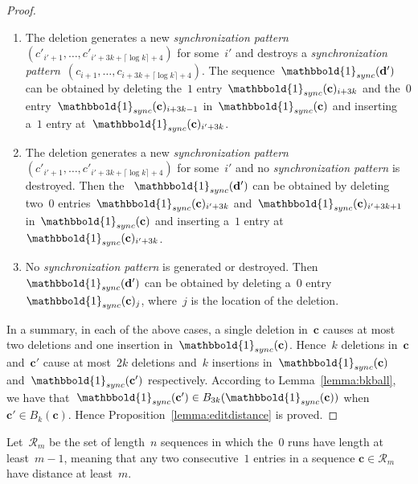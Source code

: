 \documentclass[10pt,a4paper,onecolumn]{IEEEtran}
\newcommand{\1}{\mathbbold{1}}
\newcommand{\boldc}{\mathbf{c}}
\newcommand{\boldd}{\mathbf{d}}
\begin{document}
\begin{proof}
\begin{enumerate}
\item The deletion generates a new \emph{synchronization pattern}~$(c'_{i'+1},\ldots,c'_{i'+3k+\lceil \log k\rceil +4})$ for some~$i'$ and destroys a \emph{synchronization pattern}~$(c_{i+1},\ldots,c_{i+3k+\lceil \log k\rceil +4})$. The sequence~$\1_{sync}(\boldd')$ can be obtained by deleting the~$1$ entry~$\1_{sync}(\boldc)_{i+3k}$ and the~$0$ entry~$\1_{sync}(\boldc)_{i+3k-1}$ in~$\1_{sync}(\boldc)$ and inserting a~$1$ entry at~$\1_{sync}(\boldc)_{i'+3k}$.
\item The deletion generates a new \emph{synchronization pattern}~$(c'_{i'+1},\ldots,c'_{i'+3k+\lceil \log k\rceil +4})$ for some~$i'$ and no \emph{synchronization pattern} is destroyed. Then the
~$\1_{sync}(\boldd')$ can be obtained by deleting  two~$0$ entries~$\1_{sync}(\boldc)_{i'+3k}$ and~$\1_{sync}(\boldc)_{i'+3k+1}$ in~$\1_{sync}(\boldc)$ and inserting a~$1$ entry at~$\1_{sync}(\boldc)_{i'+3k}$.
\item No \emph{synchronization pattern} is generated or destroyed. Then~$\1_{sync}(\boldd')$ can be obtained by deleting a~$0$ entry~$\1_{sync}(\boldc)_{j}$, where~$j$ is the location of the deletion.  
\end{enumerate}
In a summary, in each of the above cases, a single deletion in~$\boldc$ causes at most two deletions and one insertion in~$\1_{sync}(\boldc)$. 
Hence~$k$ deletions in~$\boldc$ and~$\boldc'$ cause at most~$2k$ deletions and~$k$ insertions in~$\1_{sync}(\boldc)$ and~$\1_{sync}(\boldc')$ respectively. According to Lemma~\ref{lemma:bkball}, we have that~$\1_{sync}(\boldc')\in B_{3k}(\1_{sync}(\boldc))$ when~$\boldc'\in B_k(\boldc)$. Hence Proposition~\ref{lemma:editdistance} is proved.
\end{proof}
Let~$\mathcal{R}_m$ be the set of length~$n$ sequences in which the~$0$ runs have length at least~$m-1$, meaning that any two consecutive~$1$ entries in a sequence $\boldc\in\mathcal{R}_m$ have distance at least~$m$. 
\end{document}
